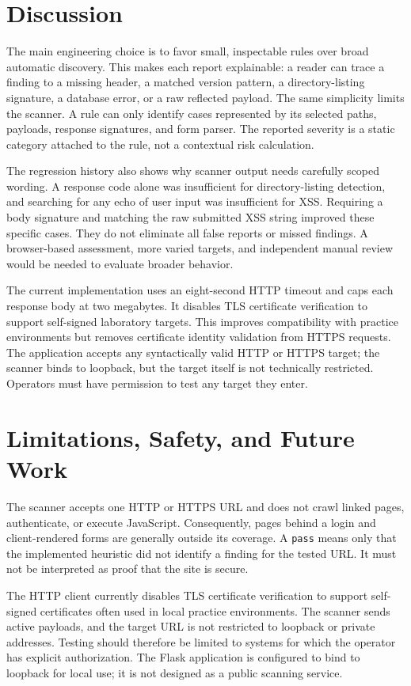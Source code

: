 \documentclass[conference]{IEEEtran}
\begin{document}
\section{Discussion}
The main engineering choice is to favor small, inspectable rules over broad
automatic discovery. This makes each report explainable: a reader can trace a
finding to a missing header, a matched version pattern, a directory-listing
signature, a database error, or a raw reflected payload. The same simplicity
limits the scanner. A rule can only identify cases represented by its selected
paths, payloads, response signatures, and form parser. The reported severity
is a static category attached to the rule, not a contextual risk calculation.

The regression history also shows why scanner output needs carefully scoped
wording. A response code alone was insufficient for directory-listing
detection, and searching for any echo of user input was insufficient for XSS.
Requiring a body signature and matching the raw submitted XSS string improved
these specific cases. They do not eliminate all false reports or missed
findings. A browser-based assessment, more varied targets, and independent
manual review would be needed to evaluate broader behavior.

The current implementation uses an eight-second HTTP timeout and caps each
response body at two megabytes. It disables TLS certificate verification to
support self-signed laboratory targets. This improves compatibility with
practice environments but removes certificate identity validation from HTTPS
requests. The application accepts any syntactically valid HTTP or HTTPS target;
the scanner binds to loopback, but the target itself is not technically
restricted. Operators must have permission to test any target they enter.

\section{Limitations, Safety, and Future Work}
The scanner accepts one HTTP or HTTPS URL and does not crawl linked pages,
authenticate, or execute JavaScript. Consequently, pages behind a login and
client-rendered forms are generally outside its coverage. A \texttt{pass}
means only that the implemented heuristic did not identify a finding for the
tested URL. It must not be interpreted as proof that the site is secure.

The HTTP client currently disables TLS certificate verification to support
self-signed certificates often used in local practice environments. The
scanner sends active payloads, and the target URL is not restricted to
loopback or private addresses. Testing should therefore be limited to systems
for which the operator has explicit authorization. The Flask application is
configured to bind to loopback for local use; it is not designed as a public
scanning service.
\end{document}
